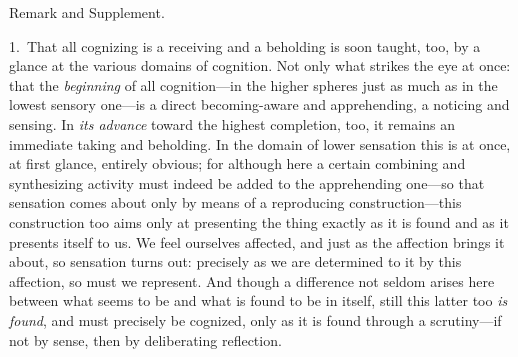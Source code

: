 \documentclass[12pt,a4paper]{book}
\begin{document}
\begin{center}Remark and Supplement.\end{center}
1.~That all cognizing is a receiving and a beholding is soon taught, too, by a
glance at the various domains of cognition. Not only what strikes the eye at
once: that the \emph{beginning} of all cognition---in the higher spheres just
as much as in the lowest sensory one---is a direct becoming-aware and
apprehending, a noticing and sensing. In \emph{its advance} toward the highest
completion, too, it remains an immediate taking and beholding. In the domain of
lower sensation this is at once, at first glance, entirely obvious; for although
here a certain combining and synthesizing activity must indeed be added to the
apprehending one---so that sensation comes about only by means of a reproducing
construction---this construction too aims only at presenting the thing exactly
as it is found and as it presents itself to us. We feel ourselves affected, and
just as the affection brings it about, so sensation turns out: precisely as we
are determined to it by this affection, so must we represent. And though a
difference not seldom arises here between what seems to be and what is found to
be in itself, still this latter too \emph{is found}, and must precisely be cognized,
only as it is found through a scrutiny---if not by sense, then by deliberating
reflection.
\end{document}
